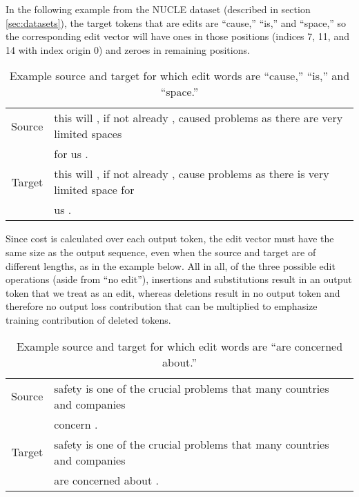 In the following example from the NUCLE dataset (described in section \ref{sec:datasets}), the target tokens that are edits are ``cause,'' ``is,'' and ``space,'' so the corresponding edit vector will have ones in those positions (indices 7, 11, and 14 with index origin 0) and zeroes in remaining positions.
\begin{table}[h]
\begin{tabular}{ r l }
\tabularnewline \hline \hline
Source &  this will , if not already , caused problems as there are very limited spaces \\
& for us . \\
Target &  this will , if not already , cause problems as there is very limited space for \\
& us . \\
\hline
\end{tabular}
\caption{Example source and target for which edit words are ``cause,'' ``is,'' and ``space.''} \label{tab:edit-vectors-example}
\end{table}

Since cost is calculated over each output token, the edit vector must have the same size as the output sequence, even when the source and target are of different lengths, as in the example below. All in all, of the three possible edit operations (aside from ``no edit''), insertions and substitutions result in an output token that we treat as an edit, whereas deletions result in no output token and therefore no output loss contribution that can be multiplied to emphasize training contribution of deleted tokens.
\begin{table}[h]
\centering
\begin{tabular}{ r l }
\tabularnewline \hline \hline
Source & safety is one of the crucial problems that many countries and companies \\
& concern . \\
Target & safety is one of the crucial problems that many countries and companies \\
& are concerned about . \\
\hline
\end{tabular}
\caption{Example source and target for which edit words are ``are concerned about.''}
\label{tab:target-longer-example}
\end{table}

